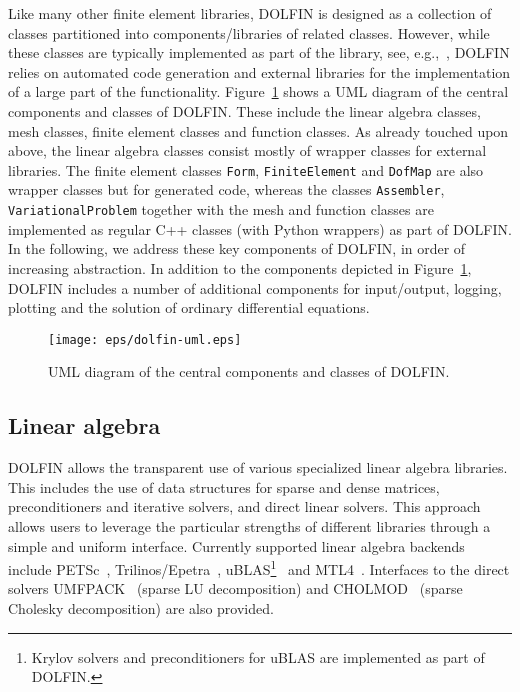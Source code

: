 \documentclass[acmtoms]{acmtrans2m}
\newcommand{\emp}[1]{\texttt{#1}}
\newcommand{\dolfin}{DOLFIN}
\begin{document}
Like many other finite element libraries, \dolfin{} is designed as a
collection of classes partitioned into components/libraries of related
classes. However, while these classes are typically implemented as
part of the library, see, e.g.,~, \dolfin{}
relies on automated code generation and external libraries for the
implementation of a large part of the functionality.
Figure~\ref{fig:uml} shows a UML diagram of the central components
and classes of \dolfin{}. These include the linear algebra classes,
mesh classes, finite element classes and function classes. As already
touched upon above, the linear algebra classes consist mostly of
wrapper classes for external libraries. The finite element classes
\emp{Form}, \emp{FiniteElement} and \emp{DofMap} are also wrapper
classes but for generated code, whereas the classes \emp{Assembler},
\emp{VariationalProblem} together with the mesh and function classes
are implemented as regular C++ classes (with Python wrappers) as part
of \dolfin{}.  In the
following, we address these key components of \dolfin{}, in order of
increasing abstraction. In addition to the components depicted in
Figure~\ref{fig:uml}, \dolfin{} includes a number of additional
components for input/output, logging, plotting and the solution of
ordinary differential equations.
\begin{figure}
  \begin{center}
    \texttt{[image: eps/dolfin-uml.eps]}
    \caption{UML diagram of the central components and classes of \dolfin{}.}
    \label{fig:uml}
  \end{center}
\end{figure}
\subsection{Linear algebra}
\label{sec:la}
\dolfin{} allows the transparent use of various specialized
linear algebra libraries. This includes the use of data structures for
sparse and dense matrices, preconditioners and iterative solvers, and
direct linear solvers. This approach allows users to leverage the
particular strengths of different libraries through a simple and
uniform interface. Currently supported linear algebra backends include
PETSc~\cite{petsc:www}, Trilinos/Epetra~\cite{trilinos:2005},
uBLAS\footnote{Krylov solvers and preconditioners for uBLAS are
  implemented as part of \dolfin{}.}~\cite{ublas:www} and
MTL4~\cite{mtl4:www}. Interfaces to the direct solvers
UMFPACK~\cite{davis:2004} (sparse LU decomposition) and
CHOLMOD~\cite{chen:2008} (sparse Cholesky decomposition) are also
provided.
\end{document}
